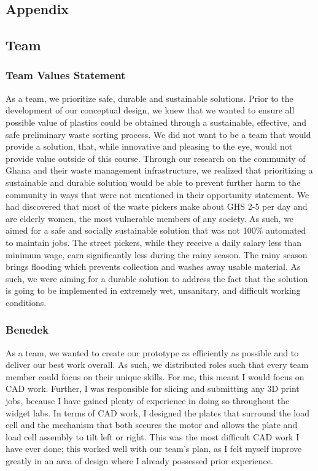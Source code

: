 \documentclass[12pt]{article}
\begin{document}
\begin{multicols*}{2}
    \newpage

    
    

    \newpage

    \section{Appendix}
        \subsection{Team}
            \subsubsection{Team Values Statement} \label{subsubsec:TVS}
            As a team, we prioritize safe, durable and sustainable solutions. Prior to the development of our conceptual design, we knew that we wanted to ensure all possible value of plastics could be obtained through a sustainable, effective, and safe preliminary waste sorting process. We did not want to be a team that would provide a solution, that, while innovative and pleasing to the eye, would not provide value outside of this course. 
            Through our research on the community of Ghana and their waste management infrastructure, we realized that prioritizing a sustainable and durable solution would be able to prevent further harm to the community in ways that were not mentioned in their opportunity statement. We had discovered that most of the waste pickers make about GHS 2-5 per day and are elderly women, the most vulnerable members of any society. As such, we aimed for a safe and socially sustainable solution that was not 100\% automated to maintain jobs. 
            The street pickers, while they receive a daily salary less than minimum wage, earn significantly less during the rainy season. The rainy season brings flooding which prevents collection and washes away usable material. As such, we were aiming for a durable solution to address the fact that the solution is going to be implemented in extremely wet, unsanitary, and difficult working conditions.

            \subsubsection{Benedek}
                As a team, we wanted to create our prototype as efficiently as possible and to deliver our best work overall. As such, we distributed roles such that every team member could focus on their unique skills. For me, this meant I would focus on CAD work. Further, I was responsible for slicing and submitting any 3D print jobs, because I have gained plenty of experience in doing so throughout the widget labs. In terms of CAD work, I designed the plates that surround the load cell and the mechanism that both secures the motor and allows the plate and load cell assembly to tilt left or right. This was the most difficult CAD work I have ever done; this worked well with our team's plan, as I felt myself improve greatly in an area of design where I already possessed prior experience.


\end{multicols*}
\end{document}
